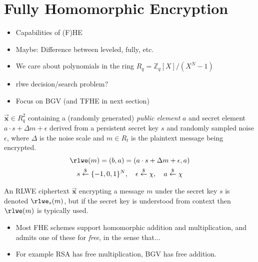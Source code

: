 \renewcommand{\vec}[1]{\overrightarrow{\mathbf{#1}}}

\section{Fully Homomorphic Encryption}
\begin{itemize}
    \item Capabilities of (F)HE
    \item Maybe: Difference between leveled, fully, etc.
    \item We care about polynomials in the ring $R_q = \mathbb{Z}_q[X]/(X^N-1)$
    \item \gls{rlwe} decision/search problem?
    \item Focus on BGV (and TFHE in next section)
\end{itemize}

\begin{definition} $\vec{x} \in R_q^2$ containing a (randomly generated) \textit{public element} $a$ and secret element $a\cdot s + \Delta m + \epsilon$ derived from a persistent secret key $s$ and randomly sampled noise $\epsilon$, where $\Delta$ is the noise scale and $m\in R_t$ is the plaintext message being encrypted.
    \begin{gather} %
        \rlwe(m) = (b, a) = (a\cdot s + \Delta m + \epsilon, a) \\
        s \overset{\$}{\leftarrow} \{-1,0,1\}^N,\quad \epsilon \overset{\$}{\leftarrow} \chi, \quad a \overset{\$}{\leftarrow} \chi
    \end{gather}

    An RLWE ciphertext $\vec{x}$ encrypting a message $m$ under the secret key $s$ is denoted $\rlwe_s(m)$, but if the secret key is understood from context then $\rlwe(m)$ is typically used.
\end{definition}

\begin{itemize}
    \item Most FHE schemes support homomorphic addition and multiplication, and admits one of these for \textit{free}, in the sense that...
    \item For example RSA has free multiplication, BGV has free addition. 
\end{itemize}

